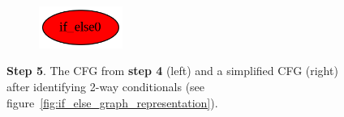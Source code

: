 \begin{figure}[htbp]
\begin{subfigure}[ht]{0.45\textwidth}
	\end{subfigure}
	\qquad
	\begin{subfigure}[ht]{0.45\textwidth}
		\centering
		\includegraphics[width=0.3\textwidth]{inc/appendices/control_flow_analysis_example/step5_after.png}
	\end{subfigure}
	\caption{\textbf{Step 5}. The CFG from \textbf{step 4} (left) and a simplified CFG (right) after identifying 2-way conditionals (see figure~\ref{fig:if_else_graph_representation}).}
	\label{fig:step_5}
\end{figure}
